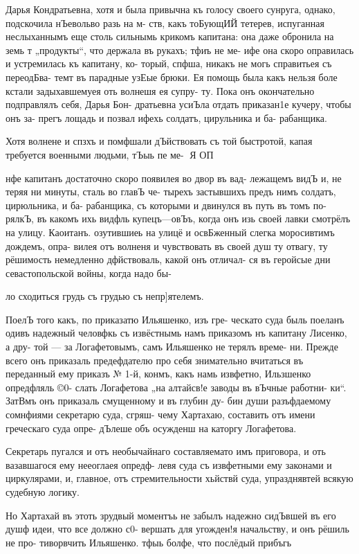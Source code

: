 Дарья Кондратьевна, хотя и была привычна къ голосу
своего сунруга, однако, подскочила нЪевольво разь на м-
ств, какъ тоБующИЙ тетерев, испуганная неслыханнымъ еще
столь сильнымь крикомъ капитана: она даже обронила на
земь т „продукты“, что держала въ рукахъ; тфиъ не ме-
ифе она скоро оправилась и устремилась къ капитану, ко-
торый, спфша, никакъ не могь справитьея съ переодБва-
темт въ парадные узЕые брюки. Ея помощь была какъ
нельзя боле кстали задыхавшемуея оть волнешя ея супру-
ту. Пока онъ окончательно подправлялъ себя, Дарья Бон-
дратьевна усиЪла отдать приказан1е кучеру, чтобы онъ за-
прегъ лощадь и позвал ифехь солдатъ, цирульника и ба-
рабанщика.

Хотя волнене и спзхъ и помфшали дЪйствовать съ той
быстротой, капая требуется военными людьми, тЪыь пе ме-
Я ОП

нфе капитанъ достаточно скоро появилея во двор въ вад-
лежащемъ видЪ и, не теряя ни минуты, сталь во главЪ че-
тырехъ застывшихъ предъ нимъ солдатъ, цирюльника, и ба-
рабанщика, съ которыми и двинулся въ путь въ томъ по-
рялкЪ, въ какомъ ихь видфль купецъ—овЪъ, когда онъ изь
своей лавки смотрёлъ на улицу. Каоитанъ. озутившиеь на
улицё и освБженный слегка моросивтимъ дождемъ, опра-
вилея отъ волненя и чувствовать въ своей душ ту отвагу,
ту рёшимость немедленно дфйствоваль, какой онъ отличал-
ся въ геройсые дни севастопольской войны, когда надо бы-

ло сходиться грудь съ грудью съ непр]ятелемъ.

ПоелЪ того какъ, по приказатю Ильяшенко, изъ гре-
ческато суда быль поеланъ одивъ надежный человфкь съ
извёстнымь намъ приказомъ нъ капитану Лисенко, а дру-
той — за Логафетовымъ, самъ Ильяшенко не терялъ време-
ни. Прежде всего онъ приказаль предефдателю про себя
знимательно вчитаться въ переданный ему приказъ № 1-й,
конмъ, какъ намь извфетно, Ильзшенко опредфляль ©0-
слать Логафетова „на алтайсв!е заводы въ вЪчные работни-
ки“. ЗатВмъ онъ приказаль смущенному и въ глубин ду-
бин души разъфдаемому сомнфиями секретарю суда, сгряш-
чему Хартахаю, составить отъ имени греческаго суда опре-
дЪлеше объ осужденш на каторгу Логафетова.

Секретарь пугался и отъ необычайнаго составляемато
имъ приговора, и оть вазавшагося ему нееоглаея опредф-
левя суда съ извфетными ему законами и циркулярами, и,
главное, отъ стремительности хьйствй суда, упразднявтей
всякую судебную логику.

Но Хартахай въ этоть зрудвый моментъь не забылъ
надежно сидЪвшей въ его душф идеи, что все должно с0-
вершать для угожден!я начальству, и онъ рёшиль не про-
тиворвчить Ильяшенко. тфыь болфе, что послёдый прибъгь

